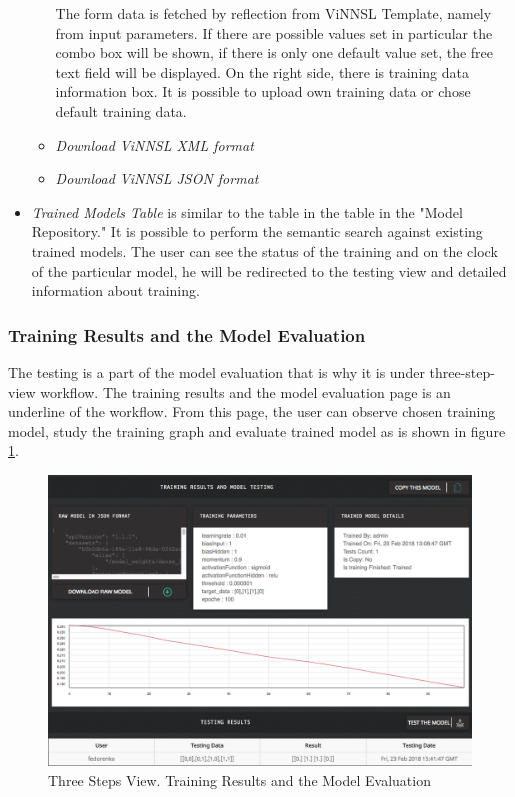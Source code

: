 \begin{itemize}
\begin{itemize}
The form data is fetched by reflection from ViNNSL Template, namely from input parameters. If there are possible values set in particular the combo box will be shown, if there is only one default value set, the free text field will be displayed.  On the right side, there is training data information box. It is possible to upload own training data or chose default training data.

\item \emph{Download ViNNSL XML format}
\item \emph{Download ViNNSL JSON format}
\end{itemize}

\item \emph{Trained Models Table} is similar to the table in the table in the "Model Repository." It is possible to perform the semantic search against existing trained models. The user can see the status of the training and on the clock of the particular model, he will be redirected to the testing view and detailed information about training.

\end{itemize}

\subsubsection{Training Results and the Model Evaluation}\label{Training results and the model evaluation}

The testing is a part of the model evaluation that is why it is under three-step-view workflow. The training results and the model evaluation page is an underline of the workflow. From this page, the user can observe chosen training model, study the training graph and evaluate trained model as is shown in figure \ref{fig:testing_model}.

\begin{figure}[htbp]
\begin{center}
  \includegraphics[width=\linewidth]{components/5/img/testing_model.png}
  \caption{Three Steps View. Training Results and the Model Evaluation}
  \label{fig:testing_model}
\end{center}
\end{figure}

